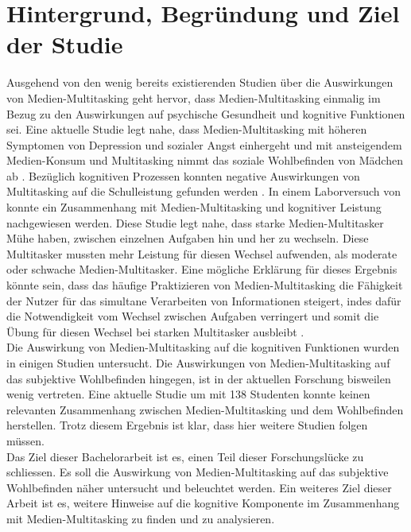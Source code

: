 \section{Hintergrund, Begründung und Ziel der Studie}\label{section.einleitung.hintergrund}
Ausgehend von den wenig bereits existierenden Studien über die Auswirkungen von Medien-Multitasking geht hervor, dass Medien-Multitasking einmalig im Bezug zu den Auswirkungen auf psychische Gesundheit und kognitive Funktionen sei. Eine aktuelle Studie legt nahe, dass Medien-Multitasking mit höheren Symptomen von Depression und sozialer Angst einhergeht \cite{Becker2013} und mit ansteigendem Medien-Konsum und Multitasking nimmt das soziale Wohlbefinden von Mädchen ab \cite{Pea2012}. Bezüglich kognitiven Prozessen konnten negative Auswirkungen von Multitasking auf die Schulleistung gefunden werden \cite{Junco2012}. In einem Laborversuch von  konnte ein Zusammenhang mit Medien-Multitasking und kognitiver Leistung nachgewiesen werden. Diese Studie legt nahe, dass starke Medien-Multitasker Mühe haben, zwischen einzelnen Aufgaben hin und her zu wechseln. Diese Multitasker mussten mehr Leistung für diesen Wechsel aufwenden, als moderate oder schwache Medien-Multitasker. Eine mögliche Erklärung für dieses Ergebnis könnte sein, dass das häufige Praktizieren von Medien-Multitasking die Fähigkeit der Nutzer für das simultane Verarbeiten von Informationen steigert, indes dafür die Notwendigkeit vom Wechsel zwischen Aufgaben verringert und somit die Übung für diesen Wechsel bei starken Multitasker ausbleibt \cite{Alzahabi2013, Watson2010}. \\
Die Auswirkung von Medien-Multitasking auf die kognitiven Funktionen wurden in einigen Studien untersucht. Die Auswirkungen von Medien-Multitasking auf das subjektive Wohlbefinden hingegen, ist in der aktuellen Forschung bisweilen wenig vertreten. Eine aktuelle Studie um  mit 138 Studenten konnte keinen relevanten Zusammenhang zwischen Medien-Multitasking und dem Wohlbefinden herstellen. Trotz diesem Ergebnis ist klar, dass hier weitere Studien folgen müssen.\\
Das Ziel dieser Bachelorarbeit ist es, einen Teil dieser Forschungslücke zu schliessen. Es soll die Auswirkung von Medien-Multitasking auf das subjektive Wohlbefinden näher untersucht und beleuchtet werden. Ein weiteres Ziel dieser Arbeit ist es, weitere Hinweise auf die kognitive Komponente im Zusammenhang mit Medien-Multitasking zu finden und zu analysieren. 
